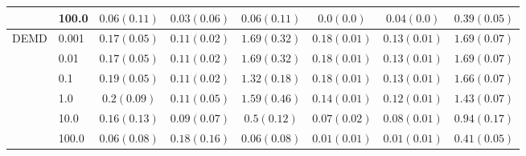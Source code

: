 \begin{table*}
\begin{tabular*}{\linewidth}{ll| *{3}{c}|*{3}{c}}
	 & 100.0 & $0.06\scriptscriptstyle(0.11)$ & $0.03\scriptscriptstyle(0.06)$ & $0.06\scriptscriptstyle(0.11)$ & $0.0\scriptscriptstyle(0.0)$ & $0.04\scriptscriptstyle(0.0)$ & $0.39\scriptscriptstyle(0.05)$ \\
\midrule
DEMD & 0.001 & $0.17\scriptscriptstyle(0.05)$ & $0.11\scriptscriptstyle(0.02)$ & $1.69\scriptscriptstyle(0.32)$ & $0.18\scriptscriptstyle(0.01)$ & $0.13\scriptscriptstyle(0.01)$ & $1.69\scriptscriptstyle(0.07)$ \\
	 & 0.01 & $0.17\scriptscriptstyle(0.05)$ & $0.11\scriptscriptstyle(0.02)$ & $1.69\scriptscriptstyle(0.32)$ & $0.18\scriptscriptstyle(0.01)$ & $0.13\scriptscriptstyle(0.01)$ & $1.69\scriptscriptstyle(0.07)$ \\
	 & 0.1 & $0.19\scriptscriptstyle(0.05)$ & $0.11\scriptscriptstyle(0.02)$ & $1.32\scriptscriptstyle(0.18)$ & $0.18\scriptscriptstyle(0.01)$ & $0.13\scriptscriptstyle(0.01)$ & $1.66\scriptscriptstyle(0.07)$ \\
	 & 1.0 & $0.2\scriptscriptstyle(0.09)$ & $0.11\scriptscriptstyle(0.05)$ & $1.59\scriptscriptstyle(0.46)$ & $0.14\scriptscriptstyle(0.01)$ & $0.12\scriptscriptstyle(0.01)$ & $1.43\scriptscriptstyle(0.07)$ \\
	 & 10.0 & $0.16\scriptscriptstyle(0.13)$ & $0.09\scriptscriptstyle(0.07)$ & $0.5\scriptscriptstyle(0.12)$ & $0.07\scriptscriptstyle(0.02)$ & $0.08\scriptscriptstyle(0.01)$ & $0.94\scriptscriptstyle(0.17)$ \\
	 & 100.0 & $0.06\scriptscriptstyle(0.08)$ & $0.18\scriptscriptstyle(0.16)$ & $0.06\scriptscriptstyle(0.08)$ & $0.01\scriptscriptstyle(0.01)$ & $0.01\scriptscriptstyle(0.01)$ & $0.41\scriptscriptstyle(0.05)$ \\
		\midrule%
	\end{tabular*}
	\label{tab:fair_reg_results_1}
\end{table*} 

